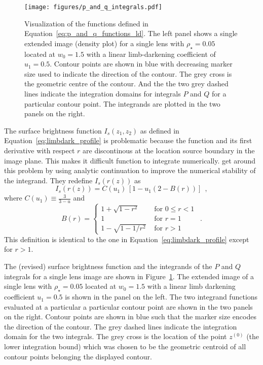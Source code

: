 \documentclass[12pt,dvipsnames]{report}
\newcommand{\hquad}{~~}
\begin{document}
\begin{figure}[t]
    \begin{centering}
        \texttt{[image: figures/p\_and\_q\_integrals.pdf]}
        \caption{Visualization of the functions defined in Equation~\ref{eq:p_and_q_functions_ld}.
        The left panel shows a single extended image (density plot) for a single lens with $\rho_\star=0.05$ 
        located at $w_0=1.5$ with a linear limb-darkening coefficient of $u_1=0.5$. Contour points
        are shown in blue with decreasing marker size used to indicate the direction of the 
        contour. The grey cross is the geometric centre of the contour. And the the two grey 
        dashed lines indicate the integration domains for integrals $P$ and $Q$ for a particular
        contour point. The integrands are plotted in the two panels on the right.}
    \label{fig:p_and_q_integrals}
    \end{centering}
\end{figure}

The surface brightness function $I_s(z_1,z_2)$ as defined in Equation~\ref{eq:limbdark_profile}
is problematic because the function and its first derivative with respect $r$ are
discontinous at the location source boundary in the image plane. This makes it difficult 
function to integrate numerically.
\citet{1998A&A...333L..79D,2007MNRAS.377.1679D} get around this problem by using analytic 
continuation to improve the numerical stability of the integrand. They redefine 
$I_s(r(z))$ as
\begin{equation}
    I_s(r(z))=C(u_1)\,\left[1-u_1\left(2-B(r)\right)\right]\hquad,
\end{equation}
where $C(u_1)\equiv\frac{3}{3-u}$  and
\begin{equation}
B(r)= 
\begin{cases}
    1+\sqrt{1-r^{2}} & \text { for } 0 \leq r<1 \\
     1 & \text { for } r=1 \\
      1-\sqrt{1-1 / r^{2}} & \text { for } r>1
    \end{cases}
    \hquad .
    \label{eq:limbdark_profile_cont}
\end{equation}
This definition is identical to the one in Equation~\ref{eq:limbdark_profile} 
except for $r>1$. 

The (revised) surface brightness function and the integrands of the $P$ and $Q$ integrals
for a single lens image are shown in Figure~\ref{fig:p_and_q_integrals}. The extended image
of a single lens with $\rho_\star=0.05$ located at $w_0=1.5$ with a 
linear limb darkening coefficient $u_1=0.5$  is shown in the panel on the left.
The two integrand functions evaluated at a particular a particular contour point  are shown
in the two panels on the right. Contour points are shown in blue such that the marker size 
encodes the direction of the contour. The grey dashed lines indicate the integration domain for the 
two integrals. The grey cross is the location of the point $z^{(0)}$ (the lower integration
bound) which was chosen to be the geometric centroid of all contour points belonging the 
displayed contour. 
\end{document}
